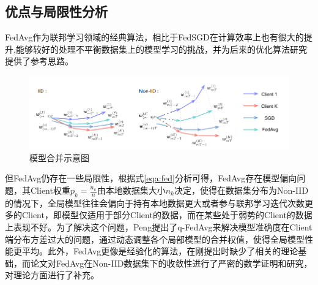 \documentclass[zihao = -4,cn]{oucart}
\begin{document}
\subsection{优点与局限性分析}
FedAvg作为联邦学习领域的经典算法，相比于FedSGD在计算效率上也有很大的提升,能够较好的处理不平衡数据集上的模型学习的挑战，并为后来的优化算法研究提供了参考思路。\par
\begin{figure}[h]
\centering %
\includegraphics[scale=0.7]{assets/avg}
\caption{模型合并示意图}
\label{fig:wavg}
\end{figure}
但FedAvg仍存在一些局限性，根据式\ref{eqa:fed}分析可得，FedAvg存在模型偏向问题，其Client权重$p_k=\frac{n_k}{n}$由本地数据集大小$n_k$决定，使得在数据集分布为Non-IID的情况下，全局模型往往会偏向于持有本地数据更大或者参与联邦学习迭代次数更多的Client，即模型仅适用于部分Client的数据，而在某些处于弱势的Client的数据上表现不好。为了解决这个问题，Peng\cite{peng2019federated}提出了q-FedAvg来解决模型准确度在Client端分布方差过大的问题，通过动态调整各个局部模型的合并权值，使得全局模型性能更平均。此外，FedAvg更像是经验化的算法，在刚提出时缺少了相关的理论基础，而论文\cite{li2019convergence}\cite{zhao2018federated}对FedAvg在Non-IID数据集下的收敛性进行了严密的数学证明和研究，对理论方面进行了补充。\par
\end{document}
